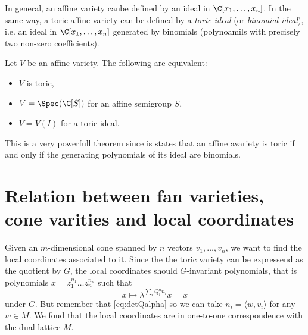 \documentclass{worksheetclass}
\begin{document}
        In general, an affine variety canbe defined by an ideal in $\C[x_1,\dots,x_n]$. In the same way, a toric affine variety can be defined by a \emph{toric ideal} (or \emph{binomial ideal}), i.e. an ideal in $\C[x_1,\dots,x_n]$ generated by binomials (polynoamils with precisely two non-zero coefficients).
        \begin{theorem*}
            Let $V$ be an affine variety. The following are equivalent:
            \begin{itemize}
                \item $V$ is toric,
                \item $V=\Spec(\C[S])$ for an affine semigroup $S$,
                \item $V=V(I)$ for a toric ideal.
            \end{itemize}
        \end{theorem*}
        This is a very powerfull theorem since is states that an affine avariety is toric if and only if the generating polynomials of its ideal are binomials.


\section{Relation between fan varieties, cone varities and local coordinates}

    Given an $m$-dimensional cone spanned by $n$ vectors $v_1,\dots,v_n$, we want to find the local coordinates associated to it. Since the the toric variety can be expressend as the quotient by $G$, the local coordinates should $G$-invariant polynomials, that is polynomials $x=z^{n_1}_1\dots z^{n_n}_n$ such that
    \begin{equation}
        x\mapsto \lambda^{\sum_i Q^a_i n_i}x=x
    \end{equation}
    under $G$. But remember that \eqref{eq:detQalpha} so we can take $n_i=\langle w,v_i\rangle$ for any $w\in M$. We foud that the local coordinates are in one-to-one correspondence with the dual lattice $M$.    
\end{document}
